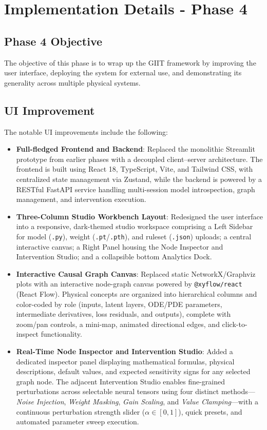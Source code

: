 \documentclass[12pt,singleside,a4paper]{article}
\begin{document}
\section{Implementation Details - Phase 4}
\subsection{Phase 4 Objective}
The objective of this phase is to wrap up the GIIT framework by improving the user interface, deploying the system for external use, and demonstrating its generality across multiple physical systems.
\subsection{UI Improvement} 
The notable UI improvements include the following:
\begin{itemize}
    \item \textbf{Full-fledged Frontend and Backend}: Replaced the monolithic Streamlit prototype from earlier phases with a decoupled client--server architecture. The frontend is built using React 18, TypeScript, Vite, and Tailwind CSS, with centralized state management via Zustand, while the backend is powered by a RESTful FastAPI service handling multi-session model introspection, graph management, and intervention execution.
    \item \textbf{Three-Column Studio Workbench Layout}: Redesigned the user interface into a responsive, dark-themed studio workspace comprising a Left Sidebar for model (\texttt{.py}), weight (\texttt{.pt}/\texttt{.pth}), and ruleset (\texttt{.json}) uploads; a central interactive canvas; a Right Panel housing the Node Inspector and Intervention Studio; and a collapsible bottom Analytics Dock.
    \item \textbf{Interactive Causal Graph Canvas}: Replaced static NetworkX/Graphviz plots with an interactive node-graph canvas powered by \texttt{@xyflow/react} (React Flow). Physical concepts are organized into hierarchical columns and color-coded by role (inputs, latent layers, ODE/PDE parameters, intermediate derivatives, loss residuals, and outputs), complete with zoom/pan controls, a mini-map, animated directional edges, and click-to-inspect functionality.
    \item \textbf{Real-Time Node Inspector and Intervention Studio}: Added a dedicated inspector panel displaying mathematical formulas, physical descriptions, default values, and expected sensitivity signs for any selected graph node. The adjacent Intervention Studio enables fine-grained perturbations across selectable neural tensors using four distinct methods---\textit{Noise Injection}, \textit{Weight Masking}, \textit{Gain Scaling}, and \textit{Value Clamping}---with a continuous perturbation strength slider ($\alpha \in [0, 1]$), quick presets, and automated parameter sweep execution.

\end{itemize}
\end{document}

